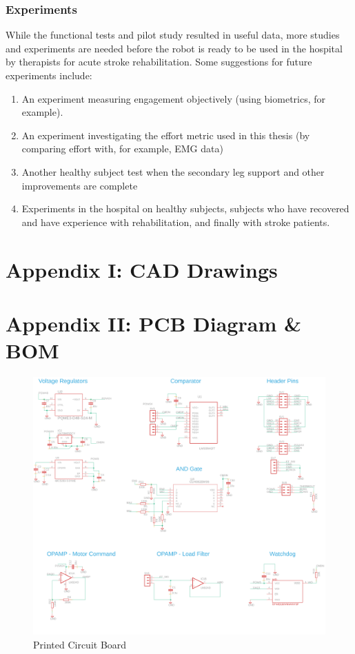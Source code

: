 \documentclass[12pt]{report}
\begin{document}
	\subsection{Experiments}
	
	While the functional tests and pilot study resulted in useful data, more studies and experiments are needed before the robot is ready to be used in the hospital by therapists for acute stroke rehabilitation. Some suggestions for future experiments include: 
	
	\begin{enumerate}
		\item An experiment measuring engagement objectively (using biometrics, for example).
		\item An experiment investigating the effort metric used in this thesis (by comparing effort with, for example, EMG data)
		\item Another healthy subject test when the secondary leg support and other improvements are complete
		\item Experiments in the hospital on healthy subjects, subjects who have recovered and have experience with rehabilitation, and finally with stroke patients.
	\end{enumerate}
	
	
\chapter*{Appendix I: CAD Drawings}
\chapter*{Appendix II: PCB Diagram \& BOM}

		
	\begin{figure}[t] 
		\centering
		\includegraphics[width=\linewidth]{pcb_schematic}
		\caption{Printed Circuit Board}
		\label{fig:pcb}
	\end{figure}
\end{document}
